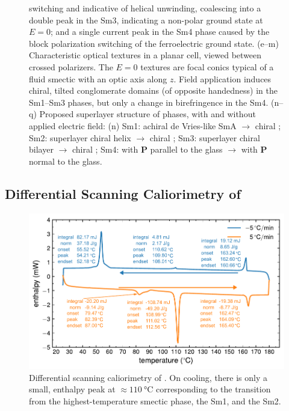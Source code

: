 \documentclass[aagreenthesis]{subfiles}
\begin{document}
\begin{figure}
{    switching\cite{findeisen2008multistage} and indicative of helical
    unwinding\cite{takezoe2010antiferroelectric}, coalescing into a double peak in the Sm3, indicating a
    non-polar ground state at $E = 0$; and a single current peak in the Sm4 phase
    caused by the block polarization switching of the ferroelectric  ground state.
    (e--m) Characteristic optical textures in a planar cell, viewed between
    crossed polarizers. The $E = 0$ textures are
    focal conics typical of a fluid smectic with an optic axis along $z$.
    Field application induces chiral, tilted conglomerate domains (of opposite
    handedness) in the Sm1--Sm3 phases, but only a
    change in birefringence in the Sm4.
    (n--q) Proposed superlayer structure of  phases, with and without
    applied electric field: (n) Sm1: achiral de Vries-like SmA
    $\rightarrow$ chiral ;  Sm2: superlayer chiral helix
    $\rightarrow$ chiral ; Sm3: superlayer chiral bilayer
     $\rightarrow$ chiral ; Sm4:  with
    $\textbf{P}$ parallel to the glass $\rightarrow$ 
    with $\textbf{P}$ normal to the glass.
            }
\end{figure}

\subsection{Differential Scanning Caliorimetry of \nfour{}}

\begin{figure}[h!]
    \centering
\includegraphics[width=\textwidth]{figs/pal30/fromPaper/figsForThesis/dsc/dsc-slowrun.pdf}
    \caption{\label{fig:pal30:dsc} Differential scanning caliorimetry of
        \nfour{}. On cooling, there is only a small, enthalpy peak at $\approx
    \SI{110}{\degreeCelsius}$ corresponding to the transition from the
highest-temperature smectic phase, the Sm1, and the Sm2.}
\end{figure}
\end{document}
